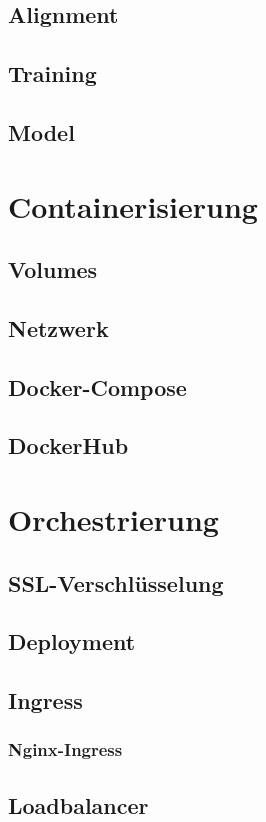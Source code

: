 \subsection{Alignment}
\subsection{Training}
\subsection{Model}

\section{Containerisierung}
\subsection{Volumes}
\subsection{Netzwerk}
\subsection{Docker-Compose}
\subsection{DockerHub}

\section{Orchestrierung}
\subsection{SSL-Verschlüsselung}
\subsection{Deployment}
\subsection{Ingress}
\subsubsection{Nginx-Ingress}
\subsection{Loadbalancer}
